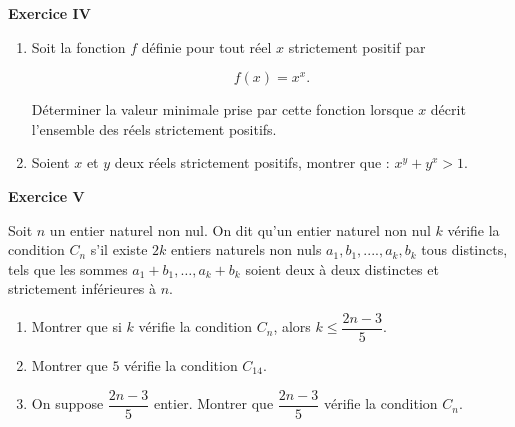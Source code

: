 \documentclass[a4paper,11pt]{article}
\begin{document}
\begin{center}\textbf{{\color{blue} Exercice IV}}
\end{center}

\medskip

\begin{enumerate}
\item Soit la fonction $f$ définie pour tout réel $x$ strictement positif par 

\[f(x) = x^x.\]

Déterminer la valeur minimale prise par cette fonction lorsque $x$ décrit l'ensemble des réels strictement positifs.
\item Soient $x$ et $y$ deux réels strictement positifs, montrer que : $x^y + y^x > 1$.
\end{enumerate}

\vskip 3mm

\begin{center}\textbf{{\color{blue} Exercice V}}
\end{center}

Soit $n$ un entier naturel non nul. On dit qu'un entier naturel non nul $k$ vérifie la
condition $C_n$ s'il existe $2k$ entiers naturels non nuls $a_1, b_1,....,a_k, b_k$ tous
distincts, tels que les sommes $a_1 + b_1,\ldots, a_k + b_k$ soient deux à deux distinctes
et strictement inférieures à $n$.

\medskip

\begin{enumerate}
\item Montrer que si $k$ vérifie la condition $C_n$, alors $k\leqslant \dfrac{2n - 3}{5}$.
\item Montrer que $5$ vérifie la condition $C_{14}$.
\item On suppose $\dfrac{2n - 3}{5}$ entier. Montrer que $\dfrac{2n - 3}{5}$
vérifie la condition $C_n$.
\end{enumerate}
\end{document}
